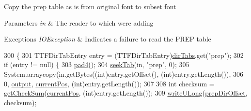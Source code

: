 Copy the prep table as is from original font to subset font


\begin{DoxyParams}{Parameters}
{\em in} & The reader to which we\textquotesingle{}re adding \\
\hline
\end{DoxyParams}

\begin{DoxyExceptions}{Exceptions}
{\em I\+O\+Exception} & Indicates a failure to read the P\+R\+EP table \\
\hline
\end{DoxyExceptions}

\begin{DoxyCode}
300                                                                   \{
301         TTFDirTabEntry entry = (TTFDirTabEntry)\mbox{\hyperlink{classorg_1_1newdawn_1_1slick_1_1tools_1_1hiero_1_1truetype_1_1_t_t_f_file_ace74820d11ce19f9c04797c2715ac728}{dirTabs}}.get(\textcolor{stringliteral}{"prep"});
302         \textcolor{keywordflow}{if} (entry != null) \{
303             \mbox{\hyperlink{classorg_1_1newdawn_1_1slick_1_1tools_1_1hiero_1_1truetype_1_1_t_t_f_sub_set_file_a0c2daa792c418ab2f19378ed0189e713}{pad4}}();
304             \mbox{\hyperlink{classorg_1_1newdawn_1_1slick_1_1tools_1_1hiero_1_1truetype_1_1_t_t_f_file_abccbd8b00bcebc8015fa41fef0239cf4}{seekTab}}(in, \textcolor{stringliteral}{"prep"}, 0);
305             System.arraycopy(in.getBytes((\textcolor{keywordtype}{int})entry.getOffset(), (int)entry.getLength()),
306                              0, \mbox{\hyperlink{classorg_1_1newdawn_1_1slick_1_1tools_1_1hiero_1_1truetype_1_1_t_t_f_sub_set_file_a967f26c7cbd2c428f7ca96c4958edded}{output}}, \mbox{\hyperlink{classorg_1_1newdawn_1_1slick_1_1tools_1_1hiero_1_1truetype_1_1_t_t_f_sub_set_file_a5027011db0d9c307afa8de09102eaa10}{currentPos}}, (\textcolor{keywordtype}{int})entry.getLength());
307 
308             \textcolor{keywordtype}{int} checksum = \mbox{\hyperlink{classorg_1_1newdawn_1_1slick_1_1tools_1_1hiero_1_1truetype_1_1_t_t_f_sub_set_file_a1626ba6cefcce691896866cd811ea675}{getCheckSum}}(\mbox{\hyperlink{classorg_1_1newdawn_1_1slick_1_1tools_1_1hiero_1_1truetype_1_1_t_t_f_sub_set_file_a5027011db0d9c307afa8de09102eaa10}{currentPos}}, (\textcolor{keywordtype}{int})entry.getLength());
309             \mbox{\hyperlink{classorg_1_1newdawn_1_1slick_1_1tools_1_1hiero_1_1truetype_1_1_t_t_f_sub_set_file_a20ed1072913a1ad998d59a761e8c4817}{writeULong}}(\mbox{\hyperlink{classorg_1_1newdawn_1_1slick_1_1tools_1_1hiero_1_1truetype_1_1_t_t_f_sub_set_file_a34b073259753c13e24288e0144019b84}{prepDirOffset}}, checksum);

\end{DoxyCode}
